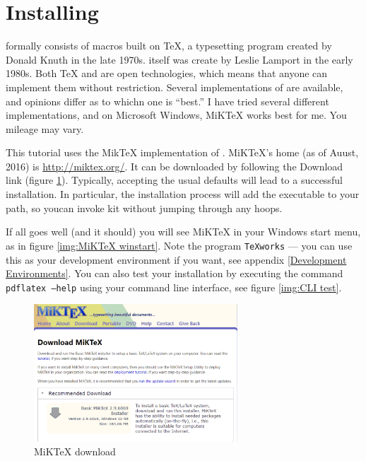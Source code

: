 

    \section{Installing \LaTeXe}
    \label{Installing}

    \Lx{} formally consists of macros built on \TeX{}, a typesetting program created by Donald Knuth in the late 1970s. \Lx{} itself was create by Leslie Lamport in the early 1980s. Both \TeX{} and \Lx{} are open technologies, which means that anyone can implement them without restriction. Several implementations of \Lx{} are available, and opinions differ as to whichn one is ``best.'' I have tried several different implementations, and on Microsoft Windows, MiKTeX works best for me. You mileage may vary.
    
    This tutorial uses the MikTeX implementation of \Lx{}. MiKTeX's home (as of Auust, 2016) is \url{http://miktex.org/}. It can be downloaded by following the Download link (figure \ref{img:MiKTeX download}).  Typically, accepting the usual defaults will lead to a successful installation. In particular, the installation process will add the executable to your path, so youcan invoke kit without jumping through any hoops.

    If all goes well (and it should) you will see MiKTeX in your Windows start menu, as in figure \ref{img:MiKTeX winstart}. Note the program \texttt{TeXworks} --- you can use this as your \Lx{} development environment if you want, see appendix \ref{Development Environments}. You can also test your installation by executing the command \texttt{pdflatex --help} using your command line interface, see figure \ref{img:CLI test}.

    \begin{figure}[!hb]
        \includegraphics[width=3in]{images/miktex-download.pdf}
        \caption{MiKTeX download}
        \label{img:MiKTeX download}
    \end{figure}

